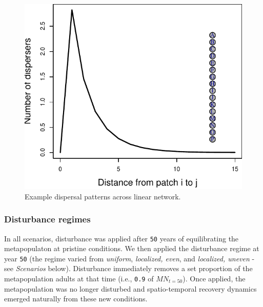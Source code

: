 \documentclass[
]{article}
\begin{document}
\begin{figure}[H]

{\centering \includegraphics{Managing_for_ecological_surprises_in_metapopulations_files/figure-latex/dispersal-1} 

}

\caption{Example dispersal patterns across linear network.}\label{fig:dispersal}
\end{figure}

\hypertarget{disturbance-regimes}{%
\subsubsection{Disturbance regimes}\label{disturbance-regimes}}

In all scenarios, disturbance was applied after \texttt{50} years of
equilibrating the metapopulaton at pristine conditions. We then applied
the disturbance regime at year \texttt{50} (the regime varied from
\emph{uniform}, \emph{localized, even}, and \emph{localized, uneven} -
see \emph{Scenarios} below). Disturbance immediately removes a set
proportion of the metapopulation adults at that time (i.e., \texttt{0.9}
of \(MN_{t=50}\)). Once applied, the metapopulation was no longer
disturbed and spatio-temporal recovery dynamics emerged naturally from
these new conditions.
\end{document}
